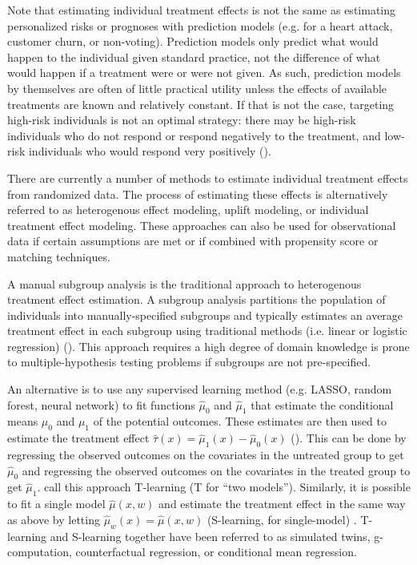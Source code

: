 Note that estimating individual treatment effects is not the same as estimating personalized risks or prognoses with prediction models (e.g. for a heart attack, customer churn, or non-voting). Prediction models only predict what would happen to the individual given standard practice, not the difference of what would happen if a treatment were or were not given. As such, prediction models by themselves are often of little practical utility unless the effects of available treatments are known and relatively constant. If that is not the case, targeting high-risk individuals is not an optimal strategy: there may be high-risk individuals who do not respond or respond negatively to the treatment, and low-risk individuals who would respond very positively (\citealp{Ascarza:2018ie}).

There are currently a number of methods to estimate individual treatment effects from randomized data. The process of estimating these effects is alternatively referred to as heterogenous effect modeling, uplift modeling, or individual treatment effect modeling. These approaches can also be used for observational data if certain assumptions are met or if combined with propensity score or matching techniques.

A manual subgroup analysis is the traditional approach to heterogenous treatment effect estimation. A subgroup analysis partitions the population of individuals into manually-specified subgroups and typically estimates an average treatment effect in each subgroup using traditional methods (i.e. linear or logistic regression) (\citealp{Gail:1985ft}). This approach requires a high degree of domain knowledge is prone to multiple-hypothesis testing problems if subgroups are not pre-specified. 

An alternative is to use any supervised learning method (e.g. LASSO, random forest, neural network) to fit functions $\hat\mu_0$ and $\hat\mu_1$ that estimate the conditional means $\mu_0$ and $\mu_1$ of the potential outcomes. These estimates are then used to estimate the treatment effect $\hat\tau(x) = \hat\mu_1(x) - \hat\mu_0(x)$ (\citealp{Gutierrez:2016tq, Austin:2012cy, Snowdn:2011ef}). This can be done by regressing the observed outcomes on the covariates in the untreated group to get $\hat\mu_0$ and regressing the observed outcomes on the covariates in the treated group to get $\hat\mu_1$. \citet{Kunzel:2017vg} call this approach T-learning (T for ``two models''). Similarly, it is possible to fit a single model $\hat\mu(x,w)$ and estimate the treatment effect in the same way as above by letting $\hat\mu_w(x) = \hat\mu(x,w)$ (S-learning, for single-model) \citealp{Kunzel:2017vg}. T-learning and S-learning together have been referred to as simulated twins, g-computation, counterfactual regression, or conditional mean regression. 

